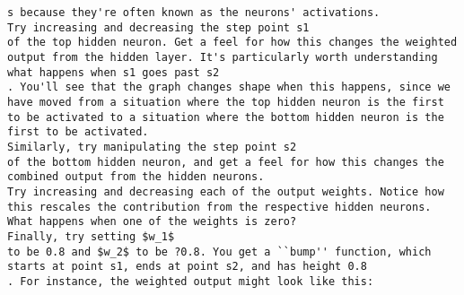 \begin{lstlisting}
s because they're often known as the neurons' activations.
Try increasing and decreasing the step point s1
of the top hidden neuron. Get a feel for how this changes the weighted output from the hidden layer. It's particularly worth understanding what happens when s1 goes past s2
. You'll see that the graph changes shape when this happens, since we have moved from a situation where the top hidden neuron is the first to be activated to a situation where the bottom hidden neuron is the first to be activated.
Similarly, try manipulating the step point s2
of the bottom hidden neuron, and get a feel for how this changes the combined output from the hidden neurons.
Try increasing and decreasing each of the output weights. Notice how this rescales the contribution from the respective hidden neurons. What happens when one of the weights is zero?
Finally, try setting $w_1$
to be 0.8 and $w_2$ to be ?0.8. You get a ``bump'' function, which starts at point s1, ends at point s2, and has height 0.8
. For instance, the weighted output might look like this:


\end{lstlisting}
